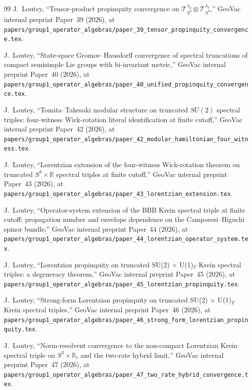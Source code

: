 \documentclass[11pt,a4paper]{article}
\theoremstyle{plain}
\theoremstyle{definition}
\newcommand{\sthree}{S^{3}}
\newcommand{\Tcal}{\mathcal{T}}
\newcommand{\R}{\mathbb{R}}
\begin{document}
\begin{thebibliography}{99}
J.~Loutey, ``Tensor-product propinquity convergence on
$\Tcal_{S^{3}}^{\lambda_{a}}\otimes\Tcal_{S^{3}}^{\lambda_{b}}$,''
GeoVac internal preprint Paper~39 (2026), at
\texttt{papers/group1\_operator\_algebras/paper\_39\_tensor\_propinquity\_convergence.tex}.

J.~Loutey, ``State-space Gromov--Hausdorff convergence of spectral
truncations of compact semisimple Lie groups with bi-invariant metric,'' GeoVac
internal preprint Paper~40 (2026), at
\texttt{papers/group1\_operator\_algebras/paper\_40\_unified\_propinquity\_convergence.tex}.

J.~Loutey, ``Tomita--Takesaki modular structure on truncated $SU(2)$
spectral triples: four-witness Wick-rotation literal identification
at finite cutoff,'' GeoVac internal preprint Paper~42 (2026), at
\texttt{papers/group1\_operator\_algebras/paper\_42\_modular\_hamiltonian\_four\_witness.tex}.

J.~Loutey, ``Lorentzian extension of the four-witness Wick-rotation
theorem on truncated $S^3 \times \mathbb{R}$ spectral triples at finite
cutoff,'' GeoVac internal preprint
Paper~43 (2026), at
\texttt{papers/group1\_operator\_algebras/paper\_43\_lorentzian\_extension.tex}.

J.~Loutey, ``Operator-system extension of the BBB Krein spectral
triple at finite cutoff: propagation number and envelope dependence
on the Camporesi--Higuchi spinor bundle,'' GeoVac internal preprint Paper~44 (2026),
at
\texttt{papers/group1\_operator\_algebras/paper\_44\_lorentzian\_operator\_system.tex}.

J.~Loutey, ``Lorentzian propinquity on truncated SU(2)
$\times$ U(1)$_{T}$ Krein spectral triples: a degeneracy theorem,'' GeoVac internal
preprint Paper~45 (2026), at
\texttt{papers/group1\_operator\_algebras/paper\_45\_lorentzian\_propinquity.tex}.

J.~Loutey, ``Strong-form Lorentzian propinquity on
truncated SU(2) $\times$ U(1)$_{T}$ Krein spectral triples,''
GeoVac internal preprint Paper~46 (2026), at
\texttt{papers/group1\_operator\_algebras/paper\_46\_strong\_form\_lorentzian\_propinquity.tex}.

J.~Loutey, ``Norm-resolvent convergence to the non-compact Lorentzian
Krein spectral triple on $\sthree\times\R_{t}$ and the two-rate
hybrid limit,'' GeoVac internal preprint Paper~47 (2026), at
\texttt{papers/group1\_operator\_algebras/paper\_47\_two\_rate\_hybrid\_convergence.tex}.

\end{thebibliography}
\end{document}
